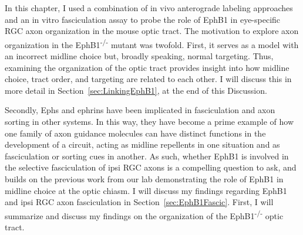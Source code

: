 In this chapter, I used a combination of in vivo anterograde labeling approaches and an in vitro fasciculation assay to probe the role of EphB1 in eye-specific RGC axon organization in the mouse optic tract.
The motivation to explore axon organization in the EphB1\textsuperscript{-/-} mutant was twofold.
First, it serves as a model with an incorrect midline choice but, broadly speaking, normal targeting.
Thus, examining the organization of the optic tract provides insight into how midline choice, tract order, and targeting are related to each other.
I will discuss this in more detail in Section~\ref{sec:LinkingEphB1}, at the end of this Discussion.

Secondly, Ephs and ephrins have been implicated in fasciculation and axon sorting in other systems.
In this way, they have become a prime example of how one family of axon guidance molecules can have distinct functions in the development of a circuit, acting as midline repellents in one situation and as fasciculation or sorting cues in another.
As such, whether EphB1 is involved in the selective fasciculation of ipsi RGC axons is a compelling question to ask, and builds on the previous work from our lab demonstrating the role of EphB1 in midline choice at the optic chiasm.
I will discuss my findings regarding EphB1 and ipsi RGC axon fasciculation in Section~\ref{sec:EphB1Fascic}.
First, I will summarize and discuss my findings on the organization of the EphB1\textsuperscript{-/-} optic tract.